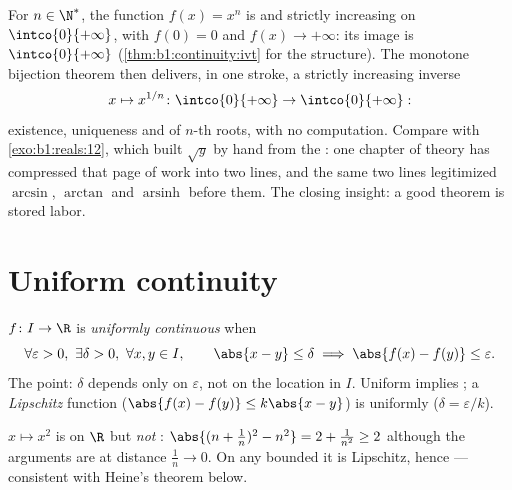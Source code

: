 \begin{example}\label{ex:b1:continuity:nthroot}
For $n \in \N^*$, the function $f(x) = x^n$ is  and
strictly increasing on $\intco{0}{+\infty}$, with $f(0) = 0$ and
$f(x) \to +\infty$: its image is $\intco{0}{+\infty}$
(\cref{thm:b1:continuity:ivt} for the  structure). The
monotone bijection theorem then delivers, in one stroke, a
strictly increasing \emph{} inverse
\[
x \mapsto x^{1/n} \colon \intco{0}{+\infty} \to
\intco{0}{+\infty} :
\]
existence, uniqueness and  of $n$-th roots, with no
computation. Compare with \cref{exo:b1:reals:12}, which built
$\sqrt y$ by hand from the : one chapter of theory has
compressed that page of work into two lines, and the same two
lines legitimized $\arcsin$, $\arctan$ and
$\operatorname{arsinh}$ before them. The closing insight: a good
theorem is stored labor.
\end{example}

\section{Uniform continuity}

\begin{definition}\label{def:b1:continuity:uniform}
$f \colon I \to \R$ is \emph{uniformly continuous} when
\[
\forall \varepsilon > 0,\ \exists \delta > 0,\ \forall x, y \in I,
\qquad \abs{x - y} \leq \delta \implies \abs{f(x) - f(y)} \leq
\varepsilon .
\]
The point: $\delta$ depends only on $\varepsilon$, not on the
location in $I$. Uniform  implies ; a
\emph{Lipschitz} function ($\abs{f(x) - f(y)} \leq k \abs{x - y}$)
is uniformly  ($\delta = \varepsilon/k$).
\end{definition}

\begin{example}\label{ex:b1:continuity:notuniform}
$x \mapsto x^2$ is  on $\R$ but \emph{not} : $\abs{(n + \frac 1n)^2 - n^2} = 2 + \frac{1}{n^2} \geq 2$
although the arguments are at distance $\frac 1n \to 0$. On any
bounded  it is Lipschitz, hence  ---
consistent with Heine's theorem below.
\end{example}

